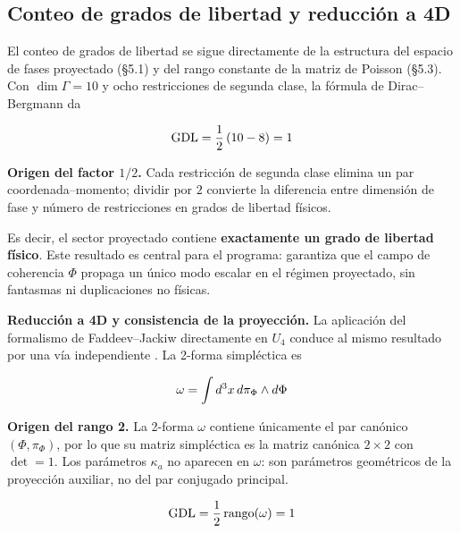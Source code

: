 ﻿\documentclass[11pt,letterpaper]{article}
\begin{document}
\subsection{Conteo de grados de libertad y reducción a 4D}
El conteo de grados de libertad se sigue directamente de la estructura del espacio de fases proyectado (§5.1) y del rango constante de la matriz de Poisson (§5.3). Con $\dim\Gamma = 10$ y ocho restricciones de segunda clase, la fórmula de Dirac--Bergmann da

\begin{equation*}
  \resizebox{\ifdim\width>\linewidth \linewidth\else\width\fi}{!}{$\displaystyle \mathrm{GDL} = \frac{1}{2}\left(10 - 8\right) = 1$}
\end{equation*}

\textbf{Origen del factor $1/2$.} Cada restricción de segunda clase elimina un par coordenada--momento; dividir por $2$ convierte la diferencia entre dimensión de fase y número de restricciones en grados de libertad físicos.

Es decir, el sector proyectado contiene \textbf{exactamente un grado de libertad físico}. Este resultado es central para el programa: garantiza que el campo de coherencia $\Phi$ propaga un único modo escalar en el régimen proyectado, sin fantasmas ni duplicaciones no físicas.

\textbf{Reducción a 4D y consistencia de la proyección.} La aplicación del formalismo de Faddeev--Jackiw directamente en $U_4$ conduce al mismo resultado por una vía independiente \cite{FaddeevJackiw1988}. La 2-forma simpléctica es

\begin{equation*}
  \resizebox{\ifdim\width>\linewidth \linewidth\else\width\fi}{!}{$\displaystyle \omega = \int d^3x\,d\pi_\Phi \wedge d\Phi$}
\end{equation*}

\textbf{Origen del rango 2.} La 2-forma $\omega$ contiene únicamente el par canónico $(\Phi, \pi_\Phi)$, por lo que su matriz simpléctica es la matriz canónica $2\times 2$ con $\det = 1$. Los parámetros $\kappa_a$ no aparecen en $\omega$: son parámetros geométricos de la proyección auxiliar, no del par conjugado principal.

\begin{equation*}
  \resizebox{\ifdim\width>\linewidth \linewidth\else\width\fi}{!}{$\displaystyle \mathrm{GDL} = \frac{1}{2}\,\mathrm{rango}(\omega) = 1$}
\end{equation*}
\end{document}
